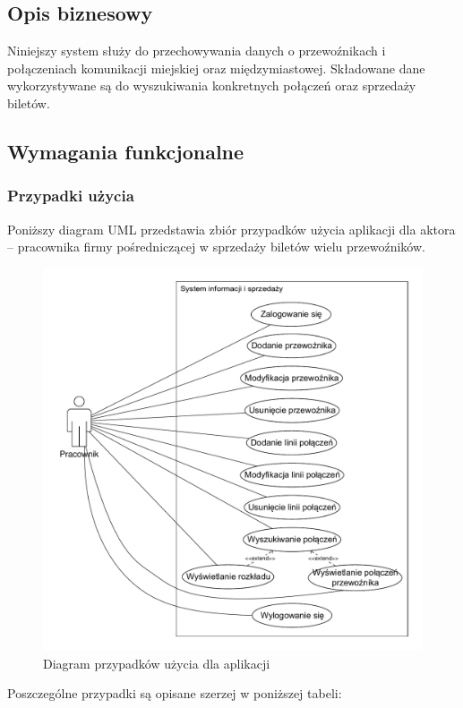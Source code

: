 \documentclass[10pt,a4paper]{article}
\begin{document}
\subsection{Opis biznesowy}
Niniejszy system służy do przechowywania danych o przewoźnikach i połączeniach komunikacji miejskiej oraz międzymiastowej. Składowane dane wykorzystywane są do wyszukiwania konkretnych połączeń oraz sprzedaży biletów.

\subsection{Wymagania funkcjonalne}

\subsubsection*{Przypadki użycia}
Poniższy diagram UML przedstawia zbiór przypadków użycia aplikacji dla aktora -- pracownika firmy pośredniczącej w sprzedaży biletów wielu przewoźników.
\begin{figure}[H]
	\centering
	\includegraphics[width=12cm]{use-case.pdf}
	\caption{Diagram przypadków użycia dla aplikacji}
\end{figure}
Poszczególne przypadki są opisane szerzej w poniższej tabeli:
\end{document}
